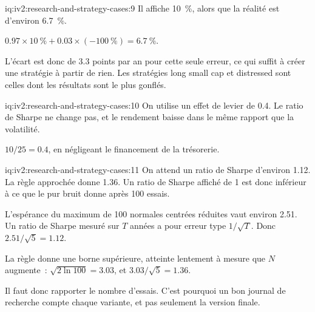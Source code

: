 \begin{solution}{iq:iv2:research-and-strategy-cases:9}
Il affiche 10~\%, alors que la réalité est d'environ 6.7~\%.

$0.97 \times 10~\% + 0.03 \times (-100~\%) = 6.7~\%$.

L'écart est donc de 3.3 points par an pour cette seule erreur, ce qui suffit à créer une stratégie à partir de rien. Les stratégies long small cap et distressed sont celles dont les résultats sont le plus gonflés.

\end{solution}

\begin{solution}{iq:iv2:research-and-strategy-cases:10}
On utilise un effet de levier de 0.4. Le ratio de Sharpe ne change pas, et le rendement baisse dans le même rapport que la volatilité.

$10/25 = 0.4$, en négligeant le financement de la trésorerie.

\end{solution}

\begin{solution}{iq:iv2:research-and-strategy-cases:11}
On attend un ratio de Sharpe d'environ 1.12. La règle approchée donne 1.36. Un ratio de Sharpe affiché de 1 est donc inférieur à ce que le pur bruit donne après 100 essais.

L'espérance du maximum de 100 normales centrées réduites vaut environ 2.51. Un ratio de Sharpe mesuré sur $T$ années a pour erreur type $1/\sqrt{T}$. Donc $2.51/\sqrt{5} = 1.12$.

La règle donne une borne supérieure, atteinte lentement à mesure que $N$ augmente~: $\sqrt{2\ln 100} = 3.03$, et $3.03/\sqrt{5} = 1.36$.

Il faut donc rapporter le nombre d'essais. C'est pourquoi un bon journal de recherche compte chaque variante, et pas seulement la version finale.

\end{solution}

